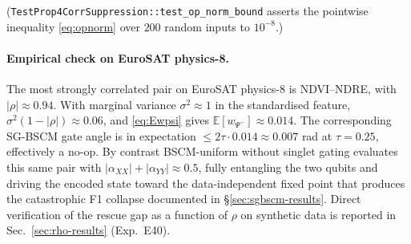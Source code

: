 \documentclass[pdflatex,sn-mathphys-num]{sn-jnl}
\theoremstyle{thmstyleone}
\theoremstyle{thmstyletwo}
\theoremstyle{thmstylethree}
\begin{document}
\noindent (\texttt{TestProp4CorrSuppression::test\_op\_norm\_bound}
asserts the pointwise inequality \eqref{eq:opnorm} over $200$ random
inputs to $10^{-8}$.)

\paragraph{Empirical check on EuroSAT physics-8.}
The most strongly correlated pair on EuroSAT physics-8 is
NDVI--NDRE, with $|\rho|\approx 0.94$. With marginal variance
$\sigma^2 \approx 1$ in the standardised feature, $\sigma^2(1-|\rho|)
\approx 0.06$, and \eqref{eq:Ewpsi} gives
$\mathbb{E}[w_{\Psi^-}]\approx 0.014$. The corresponding SG-BSCM gate
angle is in expectation $\le 2\tau\cdot 0.014 \approx 0.007$ rad at
$\tau=0.25$, effectively a no-op. By contrast BSCM-uniform without
singlet gating evaluates this same pair with
$|\alpha_{XX}|+|\alpha_{YY}|\approx 0.5$, fully entangling the two
qubits and driving the encoded state toward the data-independent
fixed point that produces the catastrophic F1 collapse documented in
\S\ref{sec:sgbscm-results}. Direct verification of the rescue gap as
a function of $\rho$ on synthetic data is reported in
Sec.~\ref{sec:rho-results} (Exp.\ E40).
\end{document}
